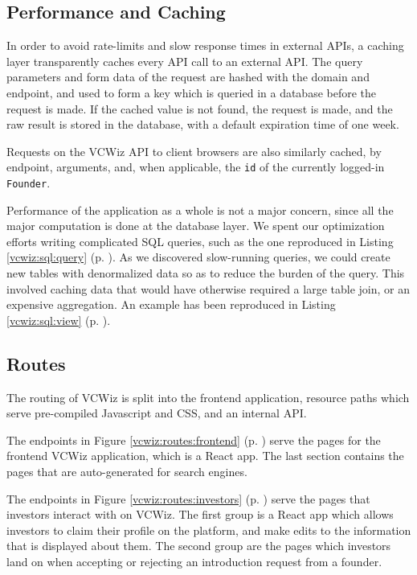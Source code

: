 \subsection{Performance and Caching}

In order to avoid rate-limits and slow response times in external APIs, a caching layer transparently caches every API call to an external API. The query parameters and form data of the request are hashed with the domain and endpoint, and used to form a key which is queried in a database before the request is made. If the cached value is not found, the request is made, and the raw result is stored in the database, with a default expiration time of one week.

Requests on the VCWiz API to client browsers are also similarly cached, by endpoint, arguments, and, when applicable, the \texttt{id} of the currently logged-in \texttt{Founder}.

Performance of the application as a whole is not a major concern, since all the major computation is done at the database layer. We spent our optimization efforts writing complicated SQL queries, such as the one reproduced in Listing \ref{vcwiz:sql:query} (p. \pageref{vcwiz:sql:query}). As we discovered slow-running queries, we could create new tables with denormalized data so as to reduce the burden of the query. This involved caching data that would have otherwise required a large table join, or an expensive aggregation. An example has been reproduced in Listing \ref{vcwiz:sql:view} (p. \pageref{vcwiz:sql:view}).

\subsection{Routes}

The routing of VCWiz is split into the frontend application, resource paths which serve pre-compiled Javascript and CSS, and an internal API.

The endpoints in Figure \ref{vcwiz:routes:frontend} (p. \pageref{vcwiz:routes:frontend}) serve the pages for the frontend VCWiz application, which is a React app. The last section contains the pages that are auto-generated for search engines.

The endpoints in Figure \ref{vcwiz:routes:investors} (p. \pageref{vcwiz:routes:investors}) serve the pages that investors interact with on VCWiz. The first group is a React app which allows investors to claim their profile on the platform, and make edits to the information that is displayed about them. The second group are the pages which investors land on when accepting or rejecting an introduction request from a founder.

